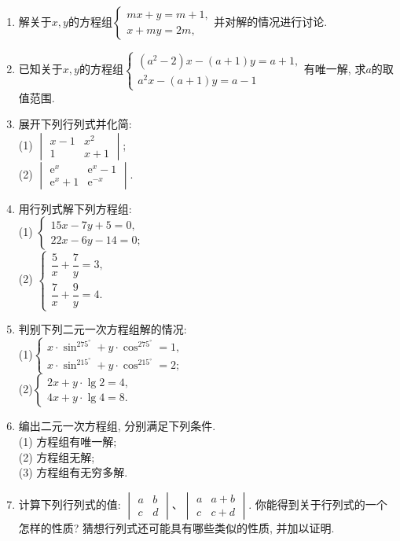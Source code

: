 \documentclass[10pt,a4paper]{article}
\begin{document}
\begin{enumerate}[1.]
\item 解关于$x,y$的方程组$\begin{cases}
    mx+y=m+1,  \\x+my=2m,  \end{cases}$并对解的情况进行讨论.
\item 已知关于$x,y$的方程组$\begin{cases}
 (a^2-2)x-(a+1)y=a+1,  \\a^2x-(a+1)y=a-1  \end{cases}$有唯一解, 求$a$的取值范围.
\item 展开下列行列式并化简:\\
(1) $\begin{vmatrix}    x-1 & x^2  \\1 & x+1  \end{vmatrix}$;\\
(2) $\begin{vmatrix}    \mathrm{e}^x & \mathrm{e}^x-1  \\\mathrm{e}^x+1 & \mathrm{e}^{-x}  \end{vmatrix}$.
\item 用行列式解下列方程组:\\
(1) $\begin{cases}
    15x-7y+5=0,  \\22x-6y-14=0;  \end{cases}$\\
(2) $\begin{cases}
    \dfrac 5x+\dfrac 7y=3,  \\\dfrac 7x+\dfrac 9y=4.  \end{cases}$
\item 判别下列二元一次方程组解的情况:\\
(1)$\begin{cases}
    x\cdot \sin ^275^{\circ }+y\cdot \cos ^275^{\circ }=1,  \\x\cdot \sin ^215^{\circ }+y\cdot \cos ^215^{\circ }=2;  \end{cases}$\\
(2)$\begin{cases}
    2x+y\cdot \lg 2=4,  \\4x+y\cdot \lg 4=8.  \end{cases}$
\item 编出二元一次方程组, 分别满足下列条件.\\
(1) 方程组有唯一解;\\
(2) 方程组无解;\\
(3) 方程组有无穷多解.
\item 计算下列行列式的值: $\begin{vmatrix}    a & b  \\c & d  \end{vmatrix}$、$\begin{vmatrix}    a & a+b  \\c & c+d  \end{vmatrix}$. 你能得到关于行列式的一个怎样的性质? 猜想行列式还可能具有哪些类似的性质, 并加以证明.

\end{enumerate}
\end{document}
